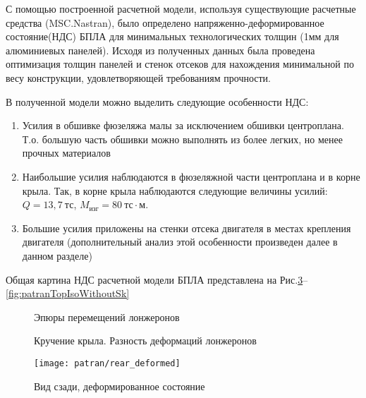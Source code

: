 \label{sec:ndsResults}

С помощью построенной расчетной модели, используя существующие расчетные средства (MSC.Nastran), было определено напряженно-деформированное состояние(НДС) БПЛА для минимальных технологических толщин (1мм для алюминиевых панелей). Исходя из полученных данных была проведена оптимизация толщин панелей и стенок отсеков для нахождения минимальной по весу конструкции, удовлетворяющей требованиям прочности.

В полученной модели можно выделить следующие особенности НДС:

\begin{enumerate}
\item Усилия в обшивке фюзеляжа малы за исключением обшивки центроплана. Т.о. большую часть обшивки можно выполнять из более легких, но менее прочных материалов
\item Наибольшие усилия наблюдаются в фюзеляжной части центроплана и в корне крыла. Так, в корне крыла наблюдаются следующие величины усилий: $Q = 13,7~\text{тс}$, $M_\text{изг} = 80~\text{тс}\cdot\text{м}$. 
\item Большие усилия приложены на стенки отсека двигателя в местах крепления двигателя (дополнительный анализ этой особенности произведен далее в данном разделе)
\end{enumerate}  

Общая картина НДС расчетной модели БПЛА представлена на Рис.\ref{fig:patranRearDeformed}--\ref{fig:patranTopIsoWithoutSk}


\begin{figure}[H]
\centering
\def\svgwidth{0.9\textwidth}

\caption{Эпюры перемещений лонжеронов}
\label{fig:WingDeformation3}
\end{figure}

\begin{figure}[H]
\centering
\def\svgwidth{0.9\textwidth}

\caption{Кручение крыла. Разность деформаций лонжеронов}
\label{fig:WingRotating}
\end{figure}


\begin{figure}[H]
\centering
\texttt{[image: patran/rear\_deformed]}
\caption{Вид сзади, деформированное состояние}
\label{fig:patranRearDeformed}
\end{figure}


